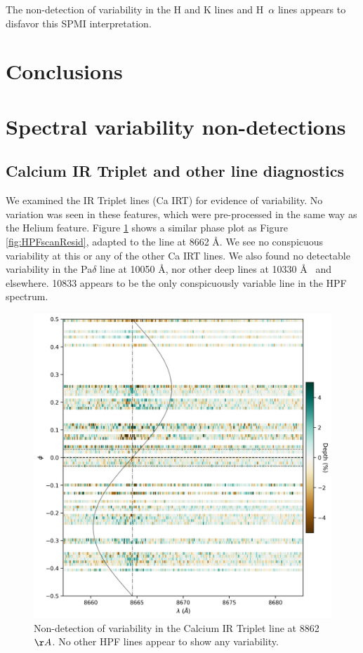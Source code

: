 \documentclass[twocolumn]{aastex631}
\begin{document}
The non-detection of variability in the  H and K lines and H~$\alpha$ lines appears to disfavor this SPMI interpretation.

\section{Conclusions}


\clearpage
\pagebreak


\appendix

\section{Spectral variability non-detections}
\subsection{Calcium IR Triplet and other line diagnostics}
We examined the  IR Triplet lines (Ca IRT) for evidence of variability.  No variation was seen in these features, which were pre-processed in the same way as the Helium feature.  Figure \ref{fig:CaPhaseScan} shows a similar phase plot as Figure \ref{fig:HPFscanResid}, adapted to the line at 8662 \AA.  We see no conspicuous variability at this or any of the other Ca IRT lines.  We also found no detectable variability in the Pa$\delta$ line at 10050 \AA, nor other deep lines at 10330 \AA~ and elsewhere.   10833 appears to be the only conspicuously variable line in the HPF spectrum.

\begin{figure}[b]
    \includegraphics[width=0.5\linewidth]{figures/Ca8662_phase_2D_diagram_resid.png}
    \caption{Non-detection of variability in the Calcium IR Triplet line at 8862 $\AA$.  No other HPF lines appear to show any variability.}
    \label{fig:CaPhaseScan}
\end{figure}
\end{document}

